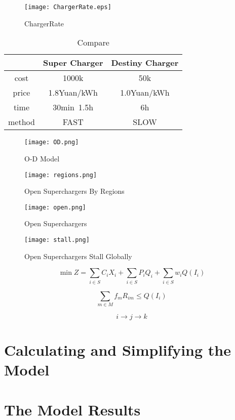 \documentclass{mcmthesis}
\begin{document}
\begin{figure}[h]
\small
\centering
\texttt{[image: ChargerRate.eps]}
\caption{ChargerRate} 
\end{figure}

\begin{table}[!htbp]
\centering
\begin{tabular}{|c|c|c|}
\hline
 &Super Charger&Destiny Charger \\
\hline
cost&1000k&50k\\
\hline
price& 1.8Yuan/kWh& 1.0Yuan/kWh\\
\hline
time& 30min~1.5h& 6h\\
\hline
method&FAST &SLOW \\
\hline
\end{tabular}
\caption{Compare}
\end{table}

\begin{figure}[h]
\small
\centering
\texttt{[image: OD.png]}
\caption{O-D Model} 
\end{figure}


\begin{figure}[h]
\small
\centering
\texttt{[image: regions.png]}
\caption{Open Superchargers By Regions} 
\end{figure}


\begin{figure}[h]
\small
\centering
\texttt{[image: open.png]}
\caption{Open Superchargers} 
\end{figure}


\begin{figure}[h]
\small
\centering
\texttt{[image: stall.png]}
\caption{Open Superchargers Stall Globally} 
\end{figure}

\[
\min Z=\sum _{i\in S}C_{i}X_{i} + \sum _{i\in S}P_{i}Q_{i} + \sum _{i\in S}w_{i}Q\left( I_{i}\right)
\]

\[	
\sum _{m\in M}f_{m}R_{im} \leq Q\left( I_{i}\right)
\]

\[
i\rightarrow j\rightarrow k
\]


\section{Calculating and Simplifying the Model  }

\section{The Model Results}
\end{document}
